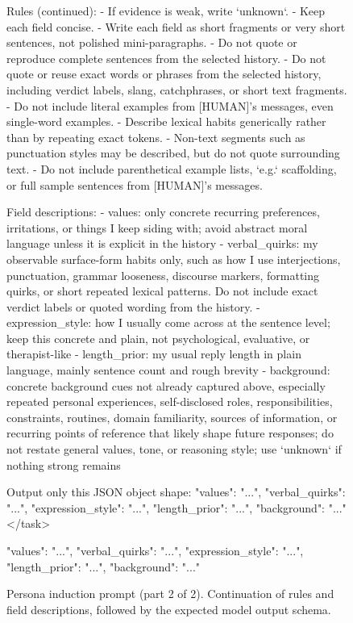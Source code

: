 \begin{figure}[t]
\centering

\begin{promptbox}
Rules (continued):
- If evidence is weak, write `unknown`.
- Keep each field concise.
- Write each field as short fragments or very short sentences, not polished mini-paragraphs.
- Do not quote or reproduce complete sentences from the selected history.
- Do not quote or reuse exact words or phrases from the selected history, including verdict labels, slang, catchphrases, or short text fragments.
- Do not include literal examples from [HUMAN]'s messages, even single-word examples.
- Describe lexical habits generically rather than by repeating exact tokens.
- Non-text segments such as punctuation styles may be described, but do not quote surrounding text.
- Do not include parenthetical example lists, `e.g.` scaffolding, or full sample sentences from [HUMAN]'s messages.

Field descriptions:
- values: only concrete recurring preferences, irritations, or things I keep siding with; avoid abstract moral language unless it is explicit in the history
- verbal_quirks: my observable surface-form habits only, such as how I use interjections, punctuation, grammar looseness, discourse markers, formatting quirks, or short repeated lexical patterns. Do not include exact verdict labels or quoted wording from the history.
- expression_style: how I usually come across at the sentence level; keep this concrete and plain, not psychological, evaluative, or therapist-like
- length_prior: my usual reply length in plain language, mainly sentence count and rough brevity
- background: concrete background cues not already captured above, especially repeated personal experiences, self-disclosed roles, responsibilities, constraints, routines, domain familiarity, sources of information, or recurring points of reference that likely shape future responses; do not restate general values, tone, or reasoning style; use `unknown` if nothing strong remains

Output only this JSON object shape:
{"values": "...", "verbal_quirks": "...", "expression_style": "...", "length_prior": "...", "background": "..."}
</task>
\end{promptbox}

\begin{promptbox}
{"values": "...", "verbal_quirks": "...", "expression_style": "...", "length_prior": "...", "background": "..."}
\end{promptbox}

\vspace{-6pt}

\caption{Persona induction prompt (part 2 of 2). Continuation of rules and field descriptions, followed by the expected model output schema.}
\label{fig:persona_induction_2}
\end{figure}
